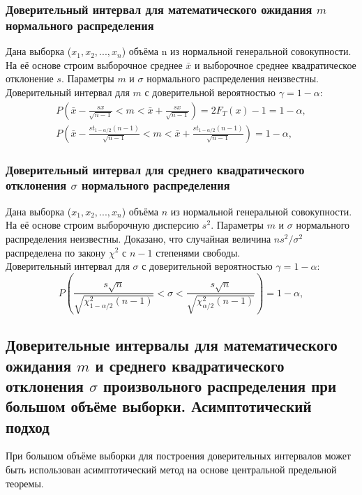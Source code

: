 \subsubsection{Доверительный интервал для математического ожидания $m$ нормального распределения}
\begin{flushleft}
	Дана выборка ($x_{1},x_{2}, ... ,x_{n}$) объёма n из нормальной генеральной совокупности. На её основе строим выборочное среднее $\bar{x}$ и выборочное среднее квадратическое отклонение $s$. Параметры $m$ и $\sigma$ нормального распределения неизвестны.\\
	Доверительный интервал для $m$ с доверительной вероятностью $\gamma = 1-\alpha$:
	\begin{equation}
		\begin{split}
			P\left(\bar{x} - \frac{sx}{\sqrt{n-1}} < m <  \bar{x} + \frac{sx}{\sqrt{n-1}}\right) = 2F_{T}(x) - 1 = 1 - \alpha,  \\
			P\left(\bar{x} - \frac{st_{1-\alpha/2}(n-1)}{\sqrt{n-1}} < m <  \bar{x} + \frac{st_{1-\alpha/2}(n-1)}{\sqrt{n-1}}\right)= 1 - \alpha, 
			\label{P_m}     
		\end{split}
	\end{equation}
\end{flushleft}

\subsubsection{Доверительный интервал для среднего квадратического отклонения $\sigma$ нормального распределения}
\begin{flushleft}
	Дана выборка ($x_{1},x_{2}, ... ,x_{n}$) объёма $n$ из нормальной генеральной совокупности. На её основе строим выборочную дисперсию $s^{2}$. Параметры $m$ и $\sigma$ нормального распределения неизвестны. Доказано, что случайная величина $ns^{2}/\sigma^{2}$ распределена по закону $\chi^{2}$ с $n-1$ степенями свободы.\\
	Доверительный интервал для $\sigma$ с доверительной вероятностью $\gamma = 1 - \alpha$:
	\begin{equation}
		P\left(\frac{s\sqrt{n}}{\sqrt{\chi^{2}_{1-\alpha/2}(n-1)}} < \sigma <  \frac{s\sqrt{n}}{\sqrt{\chi^{2}_{\alpha/2}(n-1)}}\right) = 1- \alpha,
		\label{fin_interval}
	\end{equation}
\end{flushleft}

\subsection{Доверительные интервалы для математического ожидания $m$ и среднего квадратического отклонения $\sigma$ произвольного распределения при большом объёме выборки. Асимптотический подход}
\begin{flushleft}
	При большом объёме выборки для построения доверительных интервалов может быть использован асимптотический метод на основе центральной предельной теоремы.
\end{flushleft}

